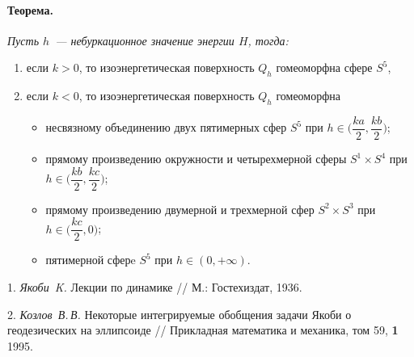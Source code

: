 	\paragraph{Теорема.} {\it Пусть $h$~--- небуркационное значение энергии $H$, тогда:
	\begin{enumerate}
		\item если $k>0$, то изоэнергетическая поверхность $Q_h$ гомеоморфна сфере $S^5$,
		\item если $k<0$, то изоэнергетическая поверхность $Q_h$ гомеоморфна
		\begin{itemize}
			\item несвязному объединению двух пятимерных сфер $S^5$ при $h \in \Big(\dfrac{ka}{2}, \dfrac{kb}{2}\Big)$;
			\item прямому произведению окружности и четырехмерной сферы ${S^1\times S^4}$ при $h \in \Big(\dfrac{kb}{2}, \dfrac{kc}{2}\Big)$;
			\item прямому произведению двумерной и трехмерной сфер $S^2\times S^3$ при $h\in \Big(\dfrac{kc}{2}, 0\Big)$;
			\item пятимерной сферe $S^5$ при $h \in (0, +\infty)$.
		\end{itemize}
	\end{enumerate}
    }
\litlist

1. {\it  Якоби~K.} Лекции по динамике // М.: Гостехиздат, 1936.

2. {\it Козлов~В.\,В.} Некоторые интегрируемые обобщения задачи Якоби о геодезических на эллипсоиде // Прикладная математика и механика, том 59, {\bf1} 1995.

